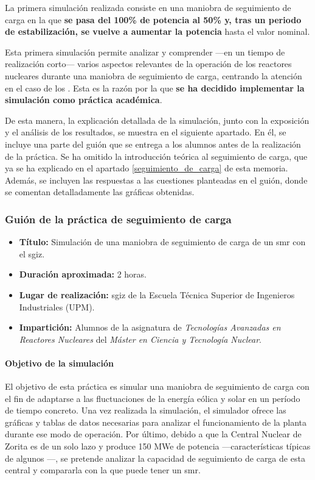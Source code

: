 La primera simulación realizada consiste en una maniobra de seguimiento de carga en la que \textbf{se pasa del 100\% de potencia al 50\% y, tras un periodo de estabilización, se vuelve a aumentar la potencia} hasta el valor nominal.

Esta primera simulación permite analizar y comprender ---en un tiempo de realización corto--- varios aspectos relevantes de la operación de los reactores nucleares durante una maniobra de seguimiento de carga, centrando la atención en el caso de los . Esta es la razón por la que \textbf{se ha decidido implementar la simulación como práctica académica}.

De esta manera, la explicación detallada de la simulación, junto con la exposición y el análisis de los resultados, se muestra en el siguiente apartado. En él, se incluye una parte del guión que se entrega a los alumnos antes de la realización de la práctica. Se ha omitido la introducción teórica al seguimiento de carga, que ya se ha explicado en el apartado \ref{seguimiento_de_carga} de esta memoria. Además, se incluyen las respuestas a las cuestiones planteadas en el guión, donde se comentan detalladamente las gráficas obtenidas.

\subsubsection{Guión de la práctica de seguimiento de carga} \label{sec:anexo1}

\begin{itemize}
    \item \textbf{Título:} Simulación de una maniobra de seguimiento de carga de un \acrshort{smr} con el \acrshort{sgiz}.
    \item \textbf{Duración aproximada:} 2 horas.
    \item \textbf{Lugar de realización:} \acrfull{sgiz} de la Escuela Técnica Superior de Ingenieros Industriales (UPM).
    \item \textbf{Impartición:} Alumnos de la asignatura de \textit{Tecnologías Avanzadas en Reactores Nucleares} del \textit{Máster en Ciencia y Tecnología Nuclear}.
\end{itemize}

\paragraph{Objetivo de la simulación}

El objetivo de esta práctica es simular una maniobra de seguimiento de carga con el fin de adaptarse a las fluctuaciones de la energía eólica y solar en un período de tiempo concreto. Una vez realizada la simulación, el simulador ofrece las gráficas y tablas de datos necesarias para analizar el funcionamiento de la planta durante ese modo de operación. Por último, debido a que la Central Nuclear de Zorita es de un solo lazo y produce 150 MWe de potencia ---características típicas de algunos ---, se pretende analizar la capacidad de seguimiento de carga de esta central y compararla con la que puede tener un \acrshort{smr}.

